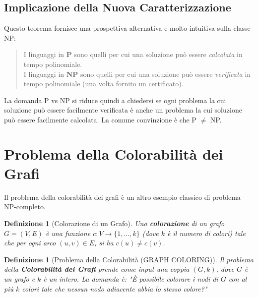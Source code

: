 \documentclass[a4paper, 11pt]{book} %
\newtheorem{definition}[theorem]{Definizione}
\theoremstyle{definition}
\begin{document}
\subsection{Implicazione della Nuova Caratterizzazione}
Questo teorema fornisce una prospettiva alternativa e molto intuitiva sulla classe NP:
\begin{quote}
    I linguaggi in \textbf{P} sono quelli per cui una soluzione può essere \emph{calcolata} in tempo polinomiale. \\
    I linguaggi in \textbf{NP} sono quelli per cui una soluzione può essere \emph{verificata} in tempo polinomiale (una volta fornito un certificato).
\end{quote}
La domanda P vs NP si riduce quindi a chiedersi se ogni problema la cui soluzione può essere facilmente verificata è anche un problema la cui soluzione può essere facilmente calcolata. La comune convinzione è che P $\ne$ NP.

\section{Problema della Colorabilità dei Grafi}
Il problema della colorabilità dei grafi è un altro esempio classico di problema NP-completo.

\begin{definition}[Colorazione di un Grafo]
Una \textbf{colorazione} di un grafo $G=(V, E)$ è una funzione $c: V \to \{1, \dots, k\}$ (dove $k$ è il numero di colori) tale che per ogni arco $(u, v) \in E$, si ha $c(u) \ne c(v)$.
\end{definition}

\begin{definition}[Problema della Colorabilità (GRAPH COLORING)]
Il problema della \textbf{Colorabilità dei Grafi} prende come input una coppia $(G, k)$, dove $G$ è un grafo e $k$ è un intero.
La domanda è: "È possibile colorare i nodi di $G$ con \emph{al più} $k$ colori tale che nessun nodo adiacente abbia lo stesso colore?"
\end{definition}
\end{document}
